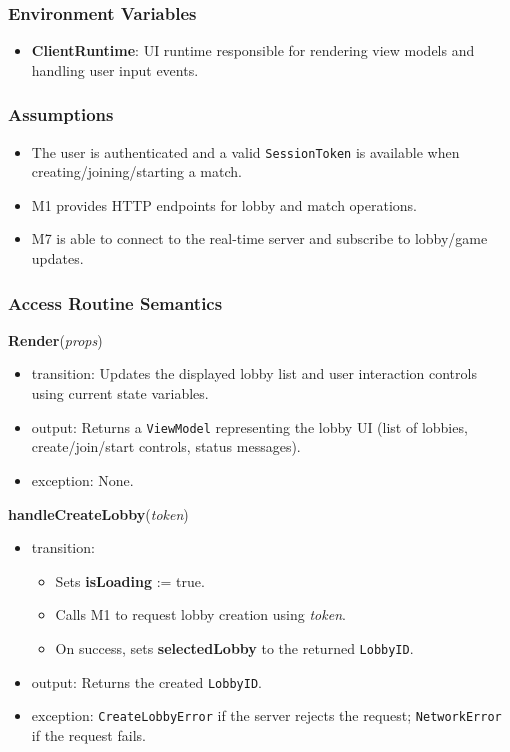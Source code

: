 \documentclass[12pt, titlepage]{article}
\begin{document}
\subsubsection{Environment Variables}
\begin{itemize}
    \item \textbf{ClientRuntime}: UI runtime responsible for rendering view models and handling user input events.
\end{itemize}

\subsubsection{Assumptions}
\begin{itemize}
    \item The user is authenticated and a valid \texttt{SessionToken} is available when creating/joining/starting a match.
    \item M1 provides HTTP endpoints for lobby and match operations.
    \item M7 is able to connect to the real-time server and subscribe to lobby/game updates.
\end{itemize}

\subsubsection{Access Routine Semantics}

\noindent\textbf{Render}(\textit{props})
\begin{itemize}
    \item transition: Updates the displayed lobby list and user interaction controls using current state variables.
    \item output: Returns a \texttt{ViewModel} representing the lobby UI (list of lobbies, create/join/start controls, status messages).
    \item exception: None.
\end{itemize}

\noindent\textbf{handleCreateLobby}(\textit{token})
\begin{itemize}
    \item transition:
    \begin{itemize}
        \item Sets \textbf{isLoading} := true.
        \item Calls M1 to request lobby creation using \textit{token}.
        \item On success, sets \textbf{selectedLobby} to the returned \texttt{LobbyID}.
    \end{itemize}
    \item output: Returns the created \texttt{LobbyID}.
    \item exception: \texttt{CreateLobbyError} if the server rejects the request; \texttt{NetworkError} if the request fails.
\end{itemize}
\end{document}
